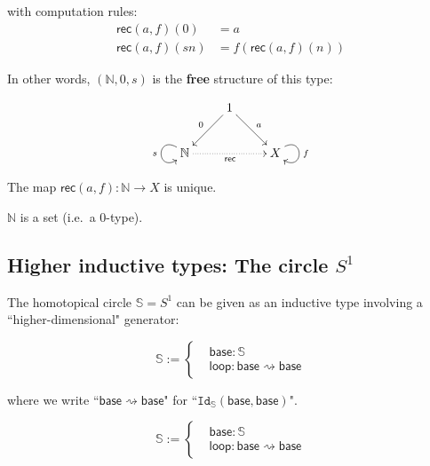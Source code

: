 \documentclass[11pt]{article}
\newcommand{\myemph}[1]{\textbf{#1}}    %
\newcommand{\Sn}{\mathbb{S}}
\newcommand{\lloop}{\mathsf{loop}}
\newcommand{\base}{\mathsf{base}}
\newcommand{\id}[1]{\texttt{Id}_{#1}}
\begin{document}
with computation rules:
\begin{align*}
\mathsf{rec}(a,f)(0) &= a\\
\mathsf{rec}(a,f)(sn) &= f(\mathsf{rec}(a,f)(n))
\end{align*}


In other words, $(\mathbb{N}, 0, s)$ is the \myemph{free} structure of this type:

$$
\xymatrix{ 
& 1  \ar[dl]_{0}  \ar[dr]^{a} & \\
\mathbb{N} \ar@(ul,dl)_{s}
\ar@{.>}[rr]_{\mathsf{rec}}
&& X\ar@(ur,dr)^{f}
} 
$$

\medskip
The map $\mathsf{rec}(a,f) :  \mathbb{N} \rightarrow X$ is unique.
\medskip

\begin{theorem} $\mathbb{N}$ is a set (i.e.\ a $0$-type).
\end{theorem}


\subsection*{Higher inductive types: The circle $S^1$}

The homotopical circle $\Sn = S^1$ can be given as an inductive type involving a ``higher-dimensional" generator:

\[
			\Sn := \begin{cases} &\base : \Sn\\
					&\lloop : \base\rightsquigarrow \base
					\end{cases}
\]
\smallskip

where we write ``$ \base\rightsquigarrow \base$" for ``$\id{\mathbb{S}}(\base,\base)$".


\[
			\Sn := \begin{cases} &\base : \Sn\\
					&\lloop : \base\rightsquigarrow \base
					\end{cases}
\]
\smallskip
\end{document}

